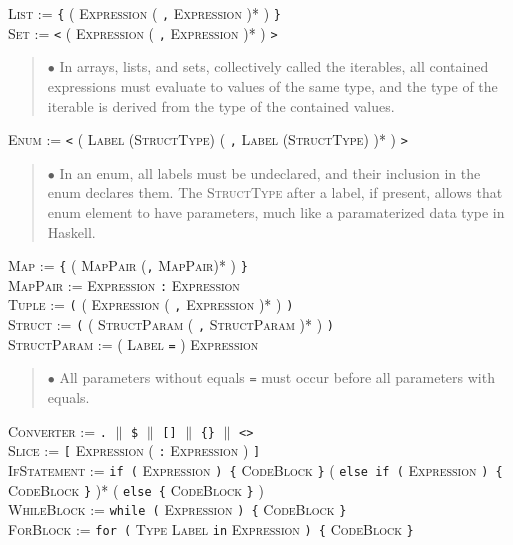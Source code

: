\documentclass{article}
\newcommand{\code}[1]{\colorbox{light-gray}{\texttt{#1}}}
\begin{document}
\textsc{List} := \code{\{} ( \textsc{Expression} ( \code{,} \textsc{Expression} )* ) \code{\}} \\

\textsc{Set} := \code{<} ( \textsc{Expression} ( \code{,} \textsc{Expression} )* ) \code{>}

\begin{quote} $\bullet$ In arrays, lists, and sets, collectively called the iterables, all contained expressions must evaluate to values of the same type, and the type of the iterable is derived from the type of the contained values. \end{quote}

\textsc{Enum} := \code{<} ( \textsc{Label} (\textsc{StructType}) ( \code{,} \textsc{Label} (\textsc{StructType}) )* ) \code{>} \\

\begin{quote} $\bullet$ In an enum, all labels must be undeclared, and their inclusion in the enum declares them. The \textsc{StructType} after a label, if present, allows that enum element to have parameters, much like a paramaterized data type in Haskell. \end{quote}

\textsc{Map} := \code{\{} ( \textsc{MapPair} (\code{,} \textsc{MapPair})* ) \code{\}} \\

\textsc{MapPair} := \textsc{Expression} \code{:} \textsc{Expression} \\

\textsc{Tuple} := \code{(} ( \textsc{Expression} ( \code{,} \textsc{Expression} )* ) \code{)} \\

\textsc{Struct} := \code{(} ( \textsc{StructParam} ( \code{,} \textsc{StructParam} )* ) \code{)} \\

\textsc{StructParam} := ( \textsc{Label} \code{=} ) \textsc{Expression}

\begin{quote} $\bullet$ All parameters without equals \code{=} must occur before all parameters with equals. \end{quote}

\textsc{Converter} := \code{.} $\|$ \code{\$} $\|$ \code{[]} $\|$ \code{\{\}} $\|$ \code{<>} \\

\textsc{Slice} := \code{[} \textsc{Expression} ( \code{:} \textsc{Expression} ) \code{]} \\

\textsc{IfStatement} := \code{if (} \textsc{Expression} \code{) \{} \textsc{CodeBlock} \code{\}} ( \code{else if (} \textsc{Expression} \code{) \{} \textsc{CodeBlock} \code{\}} )* ( \code{else \{} \textsc{CodeBlock} \code{\}} ) \\

\textsc{WhileBlock} := \code{while (} \textsc{Expression} \code{) \{} \textsc{CodeBlock} \code{\}} \\

\textsc{ForBlock} := \code{for (} \textsc{Type} \textsc{Label} \code{in} \textsc{Expression} \code{) \{} \textsc{CodeBlock} \code{\}}
\end{document}
